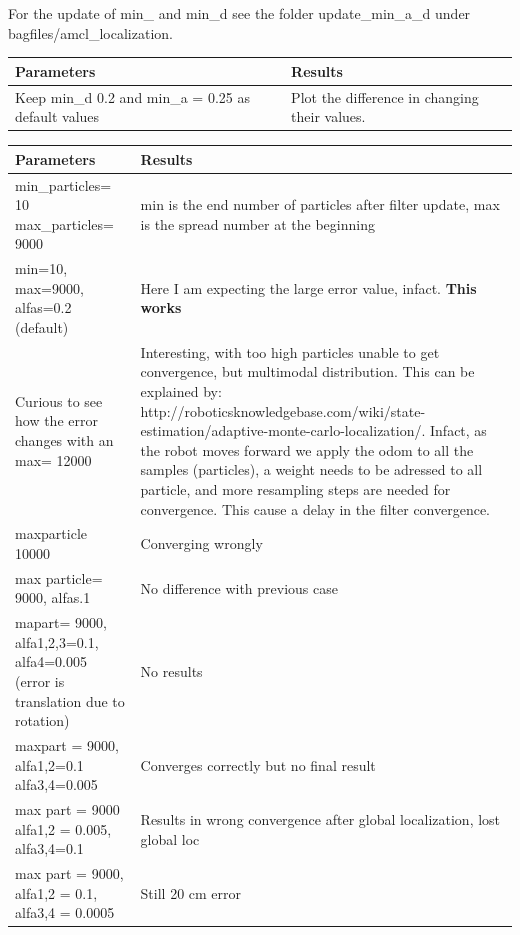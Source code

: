 \documentclass[11pt,a4paper]{article}
\begin{document}
For the update of min{\_} and min{\_}d see the folder update{\_}min{\_}a{\_}d under bagfiles/amcl{\_}localization.

\begin{center}
\begin{tabular}{| m{12em} | m{13em}|} 
\hline
\textbf{Parameters} & \textbf{Results} \\
\hline
Keep min{\_}d 0.2 and min{\_}a = 0.25 as default values & Plot the difference in changing their values. \\
\hline
\end{tabular}
\end{center}

\begin{center}
\begin{tabular}{| m{12em} | m{13em}|} 
\hline
\textbf{Parameters} & \textbf{Results} \\
\hline
min{\_}particles= 10 max{\_}particles= 9000 & min is the end number of particles after filter update, max is the spread number at the beginning\\
\hline
min=10, max=9000, alfas=0.2 (default) & Here I am expecting the large error value, infact. \textbf{This works} \\
\hline
Curious to see how the error changes with an max= 12000 & Interesting, with too high particles unable to get convergence, but multimodal distribution. This can be explained by: http://roboticsknowledgebase.com/wiki/state-estimation/adaptive-monte-carlo-localization/. Infact, as the robot moves forward we apply the odom to all the samples (particles), a weight needs to be adressed to all particle, and more resampling steps are needed for convergence. This cause a delay in the filter convergence. \\
\hline
maxparticle 10000 & Converging wrongly\\
\hline
max particle= 9000, alfas.1 & No difference with previous case\\
\hline
mapart= 9000, alfa1,2,3=0.1, alfa4=0.005 (error is translation due to rotation)& No results\\
\hline
maxpart = 9000, alfa1,2=0.1 alfa3,4=0.005 & Converges correctly but no final result\\
\hline
max part = 9000 alfa1,2 = 0.005, alfa3,4=0.1 & Results in wrong convergence after global localization, lost global loc \\
\hline
max part = 9000, alfa1,2 = 0.1,  alfa3,4 = 0.0005 & Still 20 cm error \\

\end{tabular}
\end{center}
\end{document}
